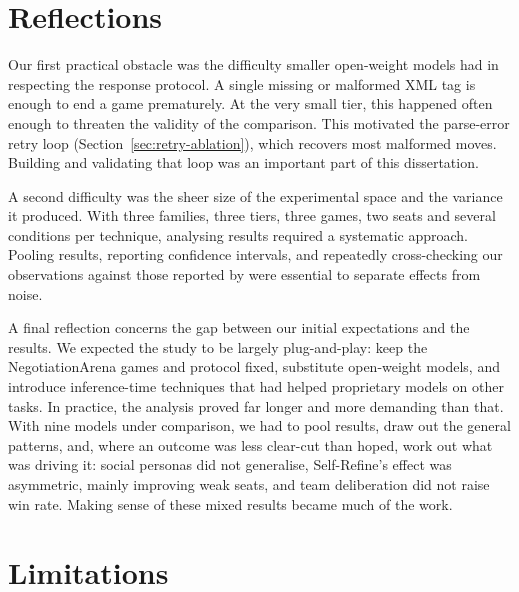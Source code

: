 \section{Reflections}\label{sec:conclusion-reflections}

Our first practical obstacle was the difficulty smaller open-weight models had in respecting the response protocol. A single missing or malformed \ac{XML} tag is enough to end a game prematurely. At the very small tier, this happened often enough to threaten the validity of the comparison. This motivated the parse-error retry loop (Section~\ref{sec:retry-ablation}), which recovers most malformed moves. Building and validating that loop was an important part of this dissertation.

A second difficulty was the sheer size of the experimental space and the variance it produced. With three families, three tiers, three games, two seats and several conditions per technique, analysing results required a systematic approach. Pooling results, reporting confidence intervals, and repeatedly cross-checking our observations against those reported by \textcite{bianchi_how_2024} were essential to separate effects from noise.

A final reflection concerns the gap between our initial expectations and the results. We expected the study to be largely plug-and-play: keep the NegotiationArena games and protocol fixed, substitute open-weight models, and introduce inference-time techniques that had helped proprietary models on other tasks. In practice, the analysis proved far longer and more demanding than that. With nine models under comparison, we had to pool results, draw out the general patterns, and, where an outcome was less clear-cut than hoped, work out what was driving it: social personas did not generalise, Self-Refine's effect was asymmetric, mainly improving weak seats, and team deliberation did not raise win rate. Making sense of these mixed results became much of the work.

\section{Limitations}\label{sec:conclusion-limitations}

